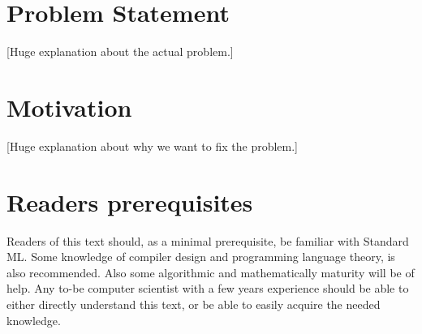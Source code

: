 
\section{Problem Statement}

{\footnotesize [Huge explanation about the actual problem.]}

\section{Motivation}

{\footnotesize [Huge explanation about why we want to fix the problem.]}

\section{Readers prerequisites}


Readers of this text should, as a minimal prerequisite, be familiar with
Standard ML. Some knowledge of compiler design and programming language theory,
is also recommended. Also some algorithmic and mathematically maturity will be
of help. Any to-be computer scientist with a few years experience should be able
to either directly understand this text, or be able to easily acquire the needed
knowledge.





